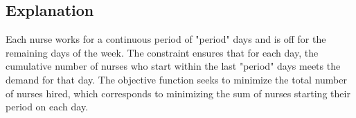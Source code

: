 \documentclass{article}
\begin{document}
\subsection*{Explanation}
Each nurse works for a continuous period of "period" days and is off for the remaining days of the week. The constraint ensures that for each day, the cumulative number of nurses who start within the last "period" days meets the demand for that day. The objective function seeks to minimize the total number of nurses hired, which corresponds to minimizing the sum of nurses starting their period on each day.
\end{document}
